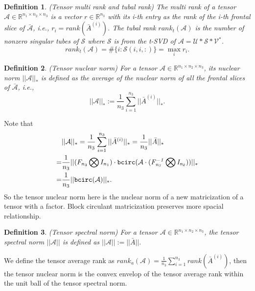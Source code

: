 \documentclass[journal,transmag]{IEEEtran}
\newtheorem{definition}{Definition}[section]
\theoremstyle{plain}
\begin{document}
\begin{definition} (Tensor multi rank and tubal rank) The multi rank of a tensor $\mathcal{A}\in \mathbb{R}^{n_1\times n_2\times n_3}$ is a vector $r\in \mathbb{R}^{n_3}$ with its i-th entry as the rank of the i-th frontal slice of $\bar{\mathcal{A}}$, i.e., $r_i=rank(\bar{A}^{(i)})$. The tubal rank $rank_t(\mathcal{A})$ is the number of nonzero singular tubes of $\mathcal{S}$ where $\mathcal{S}$ is from the t-SVD of $\mathcal{A}=\mathcal{U}*\mathcal{S}*\mathcal{V}^*$.
\begin{equation}
rank_t(\mathcal{A})=\# \{i:\mathcal{S}(i,i,:)\}=\max_i r_i.
\end{equation}
\end{definition}

\begin{definition} (Tensor nuclear norm) For a tensor $\mathcal{A}\in \mathbb{R}^{n_1\times n_2\times n_3}$, its nuclear norm $||\mathcal{A}||_*$ is defined as the average of the nuclear norm of all the frontal slices of $\bar{\mathcal{A}}$, i.e.,
\[ ||\mathcal{A}||_*:=\frac{1}{n_3}\sum_{i=1}^{n_3}||\bar{A}^{(i)}||_*.\]
\end{definition}
Note that
\begin{equation}
\begin{split}
&||\mathcal{A}||_*=\frac{1}{n_3}\sum^{n_3}_{i=1}||\bar{A}^{(i)}||_*=\frac{1}{n_3}||\bar{A}||_*\\
=&\frac{1}{n_3}||(F_{n_3}\bigotimes I_{n_1})\cdot \tt{bcirc}\it(\mathcal{A}\cdot(F_{n_3}^{-1}\bigotimes I_{n_2}))||_*\\
=&\frac{1}{n_3}||\tt{bcirc}\it(\mathcal{A})||_*.
\end{split}
\end{equation}
So the tensor nuclear norm here is the nuclear norm of a new matricization of a tensor with a factor. Block circulant matricization preserves more spacial relationship.

\begin{definition} (Tensor spectral norm) For a tensor $\mathcal{A}\in \mathbb{R}^{n_1\times n_2 \times n_3}$, the tensor spectral norm $||\mathcal{A}||$ is defined as $||\mathcal{A}||:=||\bar{A}||.$
\end{definition}
We define the tensor average rank as $rank_a(\mathcal{A})=\frac{1}{n_3}\sum_{i=1}^{n_3}rank(\bar{A}^{(i)})$,
then the tensor nuclear norm is the convex envelop of the tensor average rank within the unit ball of the tensor spectral norm.
\end{document}
